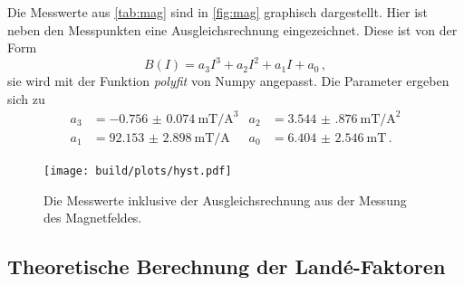   \noindent Die Messwerte aus \autoref{tab:mag} sind in \autoref{fig:mag} graphisch dargestellt. Hier ist neben den Messpunkten eine 
  Ausgleichsrechnung eingezeichnet. Diese ist von der Form 
  \begin{equation}
    B(I) = a_3 I^3 + a_2 I^2 + a_1 I + a_0\, ,
    \label{eqn:bfield}
  \end{equation}
  sie wird mit der Funktion \textit{polyfit} von Numpy angepasst. Die Parameter ergeben sich zu 
  \begin{align*}
    a_3 & = \SI{-0.756(74)}{\milli\tesla\per\ampere\tothe{3}} & a_2 & = \SI{3.544(876)}{\milli\tesla\per\ampere\squared} \\
    a_1 & = \SI{92.153(2898)}{\milli\tesla\per\ampere} & a_0 & = \SI{6.404(2546)}{\milli\tesla}  \, .
  \end{align*}

  \begin{figure}%
    \centering%
    \texttt{[image: build/plots/hyst.pdf]}%
    \caption{Die Messwerte inklusive der Ausgleichsrechnung aus der Messung des Magnetfeldes.}%
    \label{fig:mag}%
  \end{figure}%

\subsection{Theoretische Berechnung der Land\'{e}-Faktoren}

